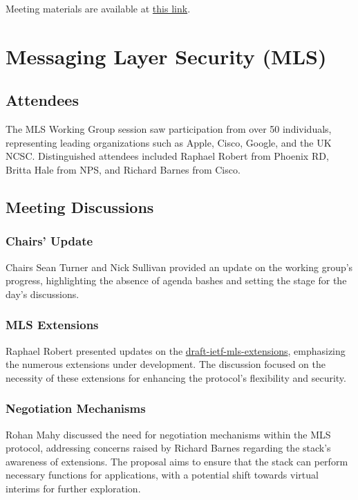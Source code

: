 \documentclass{article}
\begin{document}
Meeting materials are available at \href{https://meetings.conf.meetecho.com/ietf121/?session=33539}{this link}.



\newpage

\section{Messaging Layer Security (MLS)}

\subsection{Attendees}
The MLS Working Group session saw participation from over 50 individuals, representing leading organizations such as Apple, Cisco, Google, and the UK NCSC. Distinguished attendees included Raphael Robert from Phoenix RD, Britta Hale from NPS, and Richard Barnes from Cisco.

\subsection{Meeting Discussions}

\subsubsection{Chairs' Update}
Chairs Sean Turner and Nick Sullivan provided an update on the working group's progress, highlighting the absence of agenda bashes and setting the stage for the day's discussions.

\subsubsection{MLS Extensions}
Raphael Robert presented updates on the \href{https://datatracker.ietf.org/doc/html/draft-ietf-mls-extensions}{draft-ietf-mls-extensions}, emphasizing the numerous extensions under development. The discussion focused on the necessity of these extensions for enhancing the protocol's flexibility and security.

\subsubsection{Negotiation Mechanisms}
Rohan Mahy discussed the need for negotiation mechanisms within the MLS protocol, addressing concerns raised by Richard Barnes regarding the stack's awareness of extensions. The proposal aims to ensure that the stack can perform necessary functions for applications, with a potential shift towards virtual interims for further exploration.
\end{document}
